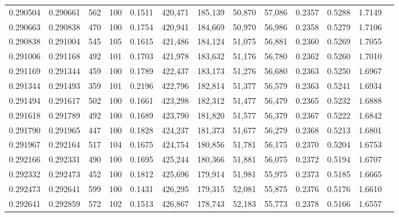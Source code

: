 \begin{tabular}{rrrrrrrrrrrrr}
0.290504 & 0.290661 &   562 & 100 &                                     0.1511 & 420,471 & 185,139 &  50,870 &  57,086 & 0.2357 & 0.5288 & 1.7149 \\
0.290663 & 0.290838 &   470 & 100 &                                     0.1754 & 420,941 & 184,669 &  50,970 &  56,986 & 0.2358 & 0.5279 & 1.7106 \\
0.290838 & 0.291004 &   545 & 105 &                                     0.1615 & 421,486 & 184,124 &  51,075 &  56,881 & 0.2360 & 0.5269 & 1.7055 \\
0.291006 & 0.291168 &   492 & 101 &                                     0.1703 & 421,978 & 183,632 &  51,176 &  56,780 & 0.2362 & 0.5260 & 1.7010 \\
0.291169 & 0.291344 &   459 & 100 &                                     0.1789 & 422,437 & 183,173 &  51,276 &  56,680 & 0.2363 & 0.5250 & 1.6967 \\
0.291344 & 0.291493 &   359 & 101 &                                     0.2196 & 422,796 & 182,814 &  51,377 &  56,579 & 0.2363 & 0.5241 & 1.6934 \\
0.291494 & 0.291617 &   502 & 100 &                                     0.1661 & 423,298 & 182,312 &  51,477 &  56,479 & 0.2365 & 0.5232 & 1.6888 \\
0.291618 & 0.291789 &   492 & 100 &                                     0.1689 & 423,790 & 181,820 &  51,577 &  56,379 & 0.2367 & 0.5222 & 1.6842 \\
0.291790 & 0.291965 &   447 & 100 &                                     0.1828 & 424,237 & 181,373 &  51,677 &  56,279 & 0.2368 & 0.5213 & 1.6801 \\
0.291967 & 0.292164 &   517 & 104 &                                     0.1675 & 424,754 & 180,856 &  51,781 &  56,175 & 0.2370 & 0.5204 & 1.6753 \\
0.292166 & 0.292331 &   490 & 100 &                                     0.1695 & 425,244 & 180,366 &  51,881 &  56,075 & 0.2372 & 0.5194 & 1.6707 \\
0.292332 & 0.292473 &   452 & 100 &                                     0.1812 & 425,696 & 179,914 &  51,981 &  55,975 & 0.2373 & 0.5185 & 1.6665 \\
0.292473 & 0.292641 &   599 & 100 &                                     0.1431 & 426,295 & 179,315 &  52,081 &  55,875 & 0.2376 & 0.5176 & 1.6610 \\
0.292641 & 0.292859 &   572 & 102 &                                     0.1513 & 426,867 & 178,743 &  52,183 &  55,773 & 0.2378 & 0.5166 & 1.6557 \\

\end{tabular}
